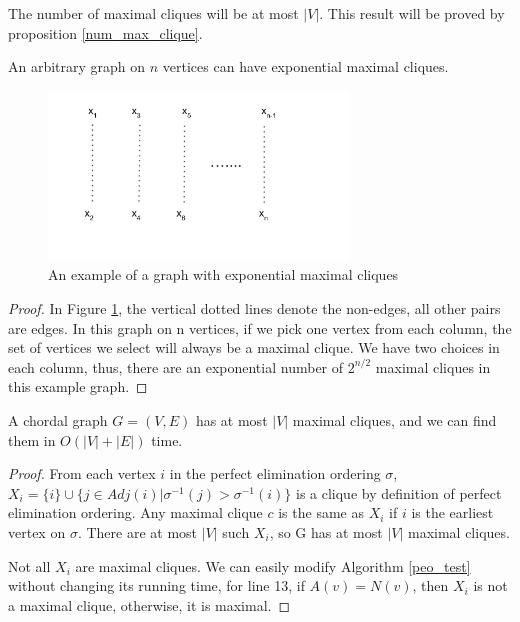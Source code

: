 The number of maximal cliques will be at most $|V|$. This result will be proved by proposition \ref{num_max_clique}. 

\begin{proposition}
An arbitrary graph on $n$ vertices can have exponential maximal cliques.
\end{proposition}

\begin{figure}[H]
\centering
\includegraphics[width=8cm]{figures/recognition_1.pdf}
\caption{An example of a graph with exponential maximal cliques}
\label{recognition_1}
\end{figure}

\begin{proof}
In Figure \ref{recognition_1}, the vertical dotted lines denote the non-edges, all other pairs are edges. In this graph on n vertices, if we pick one vertex from each column, the set of vertices we select will always be a maximal clique. We have two choices in each column, thus, there are an exponential number of $2^{n/2}$ maximal cliques in this example graph.
\end{proof}

\begin{proposition}
\label{num_max_clique}
A chordal graph $G = (V, E)$ has at most $|V|$ maximal cliques, and we can find them in $O(|V|+|E|)$ time.
\end{proposition}

\begin{proof}
From each vertex $i$ in the perfect elimination ordering $\sigma$, $X_i = \{i\} \cup \{j \in Adj(i) |  \sigma^{-1}(j) > \sigma^{-1}(i) \} $ is a clique by definition of perfect elimination ordering. Any maximal clique $c$ is the same as $X_i$ if $i$ is the earliest vertex on $\sigma$. There are at most $|V|$ such $X_i$, so G has at most $|V|$ maximal cliques.

Not all $X_i$ are maximal cliques. We can easily modify Algorithm \ref{peo_test} without changing its running time, for line 13, if $A(v) = N(v)$, then $X_i$ is not a maximal clique, otherwise, it is maximal.
\end{proof}

